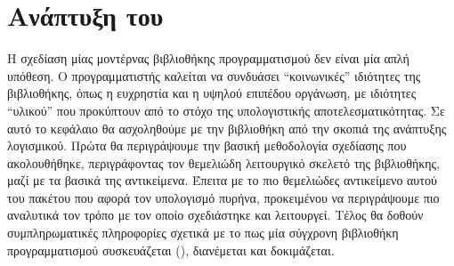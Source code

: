 \chapter{Ανάπτυξη του }
\label{chap3}
Η σχεδίαση μίας μοντέρνας βιβλιοθήκης προγραμματισμού δεν είναι μία απλή υπόθεση.
Ο προγραμματιστής καλείται να συνδυάσει ``κοινωνικές'' ιδιότητες της βιβλιοθήκης, όπως η ευχρηστία και η υψηλού επιπέδου οργάνωση, με ιδιότητες ``υλικού'' που προκύπτουν από το στόχο της υπολογιστικής αποτελεσματικότητας.
Σε αυτό το κεφάλαιο θα ασχοληθούμε με την βιβλιοθήκη από την σκοπιά της ανάπτυξης λογισμικού.
Πρώτα θα περιγράψουμε την βασική μεθοδολογία σχεδίασης που ακολουθήθηκε, περιγράφοντας τον θεμελιώδη λειτουργικό σκελετό της βιβλιοθήκης, μαζί με τα βασικά της αντικείμενα.
Έπειτα με το πιο θεμελιώδες αντικείμενο αυτού του πακέτου που αφορά τον υπολογισμό πυρήνα, προκειμένου να περιγράψουμε πιο αναλυτικά τον τρόπο με τον οποίο σχεδιάστηκε και λειτουργεί.
Τέλος θα δοθούν συμπληρωματικές πληροφορίες σχετικά με το πως μία σύγχρονη βιβλιοθήκη προγραμματισμού συσκευάζεται (), διανέμεται και δοκιμάζεται.
